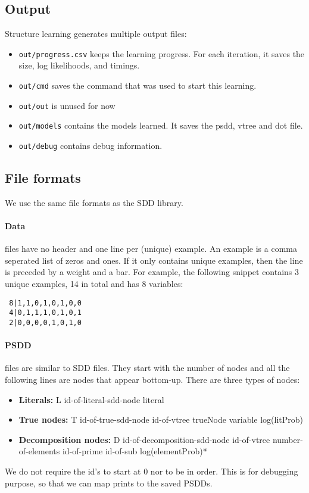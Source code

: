 \documentclass[a4paper,10pt]{article}
\begin{document}
\subsection{Output}

Structure learning generates multiple output files:

\begin{itemize}
 \item {\tt out/progress.csv} keeps the learning progress. For each iteration, it saves the size, log likelihoods, and timings.
 \item {\tt out/cmd} saves the command that was used to start this learning.
 \item {\tt out/out} is unused for now
 \item {\tt out/models} contains the models learned. It saves the psdd, vtree and dot file.
 \item {\tt out/debug} contains debug information.
\end{itemize}


\subsection{File formats}
We use the same file formats as the SDD library.

\paragraph{Data} files have no header and one line per (unique) example. An example is a comma seperated list  of zeros and ones. If it only contains unique examples, then the line is preceded by a weight and a bar. For example, the following snippet contains 3 unique examples, 14 in total and has 8 variables:

\begin{verbatim}
 8|1,1,0,1,0,1,0,0
 4|0,1,1,1,0,1,0,1
 2|0,0,0,0,1,0,1,0
\end{verbatim}

\paragraph{PSDD} files are similar to SDD files. They start with the number of nodes and all the following lines are nodes that appear bottom-up. There are three types of nodes:
\begin{itemize}
 \item {\bf Literals:} L id-of-literal-sdd-node literal
 \item {\bf True nodes:} T id-of-true-sdd-node id-of-vtree trueNode variable log(litProb)
 \item {\bf Decomposition nodes:} D id-of-decomposition-sdd-node id-of-vtree number-of-elements {id-of-prime id-of-sub log(elementProb)}*
\end{itemize}
We do not require the id's to start at 0 nor to be in order. This is for debugging purpose, so that we can map prints to the saved PSDDs.
\end{document}
